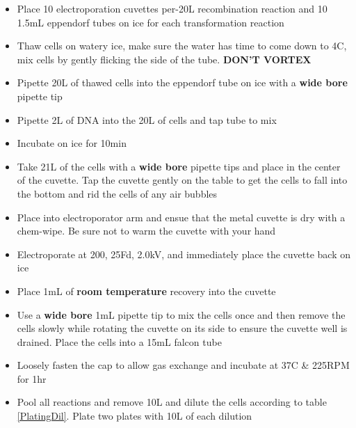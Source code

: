 \documentclass[a4paper]{article}
\begin{document}
       	\begin{itemize}
        
        	\item Place 10 electroporation cuvettes per-20\textmu L recombination reaction and 10 1.5mL eppendorf tubes on ice for each transformation reaction
            
            \item Thaw cells on watery ice, make sure the water has time to come down to 4C, mix cells by gently flicking the side of the tube. \textbf{DON’T VORTEX}
            
            \item Pipette 20\textmu L of thawed cells into the eppendorf tube on ice with a \textbf{wide bore} pipette tip
        	
            \item Pipette 2\textmu L of DNA into the 20\textmu L of cells and tap tube to mix
            
            \item Incubate on ice for 10min
            
            \item Take 21\textmu L of the cells with a \textbf{wide bore} pipette tips and place in the center of the cuvette. Tap the cuvette gently on the table to get the cells to fall into the bottom and rid the cells of any air bubbles 
 
            \item Place into electroporator arm and ensue that the metal cuvette is dry with a chem-wipe. Be sure not to warm the cuvette with your hand

            \item Electroporate at 200\textohm , 25\textmu Fd, 2.0kV, and immediately place the cuvette back on ice

            \item Place 1mL of \textbf{room temperature} recovery into the cuvette

            \item Use a \textbf{wide bore} 1mL pipette tip to mix the cells once and then remove the cells slowly while rotating the cuvette on its side to ensure the cuvette well is drained. Place the cells into a 15mL falcon tube

            \item Loosely fasten the cap to allow gas exchange and incubate at 37C \& 225RPM for 1hr

			\item Pool all reactions and remove 10\textmu L and dilute the cells according to table \ref{PlatingDil}. Plate two plates with 10\textmu L of each dilution
            

\end{itemize}
\end{document}
